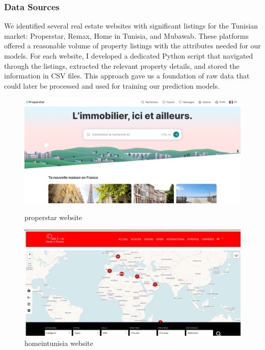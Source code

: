 \subsubsection{Data Sources}
We identified several real estate websites with
significant listings for the Tunisian market: Properstar, Remax, Home in Tunisia, and
Mubawab. These platforms offered a reasonable volume of property listings with the
attributes needed for our models. For each website, I developed a dedicated Python
script that navigated through the listings, extracted the relevant property details, and
stored the information in CSV files. This approach gave us a foundation of raw data that
could later be processed and used for training our prediction models.
\newpage
\begin{figure}[htbp]
    \centering
    \begin{minipage}{0.47\textwidth}
        \centering
        \includegraphics[width=\linewidth]{images/properstar.png}
        \caption{properstar website}
        \label{fig:properstar-website}
    \end{minipage}
    \hfill
    \begin{minipage}{0.47\textwidth}
        \centering
        \includegraphics[width=\linewidth]{images/home_in_tunisia.png}
        \caption{homeintunisia website}
        \label{fig:homeintunisia-website}
    \end{minipage}
    

\end{figure}
